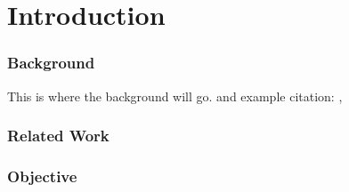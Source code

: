 
\chapter{Introduction} %
\label{Chapter1} %

\subsection{Background}
This is where the background will go. and example citation: \cite{Reference1}
\parencite{Reference3}, \cite[I have no idea what  post note is but lets try]{Reference2}
\subsection{Related Work}

\subsection{Objective}
